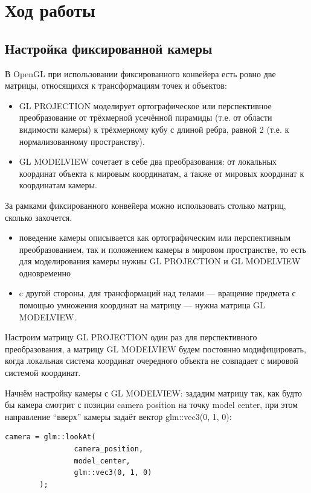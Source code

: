 \documentclass[14pt,a4paper,report]{report}
\begin{document}
\section{Ход работы}

\subsection{Настройка фиксированной камеры}
В OpenGL при использовании фиксированного конвейера есть ровно две матрицы, относящихся к трансформациям точек и объектов:
\begin{itemize}

\item GL PROJECTION моделирует ортографическое или перспективное преобразование от трёхмерной усечённой пирамиды (т.е. от области видимости камеры) к трёхмерному кубу с длиной ребра, равной 2 (т.е. к нормализованному пространству).
\item GL MODELVIEW сочетает в себе два преобразования: от локальных координат объекта к мировым координатам, а также от мировых координат к координатам камеры.
\end{itemize}

За рамками фиксированного конвейера можно использовать столько матриц, сколько захочется. 

\begin{itemize}
\item поведение камеры описывается как ортографическим или перспективным преобразованием, так и положением камеры в мировом пространстве, то есть для моделирования камеры нужны GL PROJECTION и GL MODELVIEW одновременно
\item c другой стороны, для трансформаций над телами —  вращение предмета с помощью умножения координат на матрицу — нужна матрица GL MODELVIEW.
\end{itemize}

Настроим матрицу GL PROJECTION один раз для перспективного преобразования, а матрицу GL MODELVIEW будем постоянно модифицировать, когда локальная система координат очередного объекта не совпадает с мировой системой координат.

Начнём настройку камеры с GL MODELVIEW: зададим матрицу так, как будто бы камера смотрит с позиции camera position на точку model center, при этом направление “вверх” камеры задаёт вектор glm::vec3(0, 1, 0):

\begin{lstlisting}
camera = glm::lookAt(
                camera_position,
                model_center,
                glm::vec3(0, 1, 0)
        );
\end{lstlisting}
\end{document}
